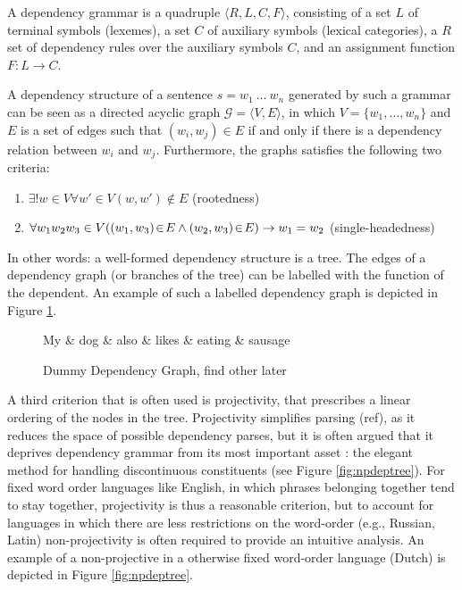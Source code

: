 \documentclass{report}
\theoremstyle{break}
\begin{document}
A dependency grammar is a quadruple $\langle R,L,C,F\rangle$, consisting of a set $L$ of terminal symbols (lexemes), a set $C$ of auxiliary symbols (lexical categories), a $R$ set of dependency rules over the auxiliary symbols $C$, and an assignment function $F : L\rightarrow C$.\citep{hays1964dependency,gaifman1965dependency}

A dependency structure of a sentence $s = w_1~\ldots~w_n$ generated by such a grammar can be seen as a directed acyclic graph $\mathcal{G} = \langle V, E\rangle$, in which $V = \{w_1, \ldots,w_n\}$ and $E$ is a set of edges such that $(w_i,w_j)\in E$ if and only if there is a dependency relation between $w_i$ and $w_j$. Furthermore, the graphs satisfies the following two criteria:
\begin{enumerate}
\item $\exists! w\in V \forall w'\in V (w,w')\notin E$ (rootedness)
\item $\forall w_1 w_2 w_3 \in V( (w_1,w_3)\negthinspace\in\negthinspace E \land (w_2,w_3)\negthinspace \in\negthinspace E ) \rightarrow w_1 = w_2$ (single-headedness)
\end{enumerate} 

In other words: a well-formed dependency structure is a tree. The edges of a dependency graph (or branches of the tree) can be labelled with the function of the dependent. An example of such a labelled dependency graph is depicted in Figure \ref{fig:depgraph}.

\begin{figure}[!ht]
\centering
\begin{dependency}[theme=simple]%
\begin{deptext}[column sep=.5cm, row sep=.1ex]
My \& dog \& also \& likes \& eating \& sausage \\
\end{deptext}
\end{dependency}
\caption{Dummy Dependency Graph, find other later}\label{fig:depgraph}
\end{figure}

A third criterion that is often used is projectivity, that prescribes a linear ordering of the nodes in the tree. Projectivity simplifies parsing (ref), as it reduces the space of possible dependency parses, but it is often argued that it deprives dependency grammar from its most important asset \citep{covington1990dependency,debusmann2000introduction}: the elegant method for handling discontinuous constituents (see Figure \ref{fig:npdeptree}). For fixed word order languages like English, in which phrases belonging together tend to stay together, projectivity is thus a reasonable criterion, but to account for languages in which there are less restrictions on the word-order (e.g., Russian, Latin) non-projectivity is often required to provide an intuitive analysis. An example of a non-projective in a otherwise fixed word-order language (Dutch) is depicted in Figure \ref{fig:npdeptree}.
\end{document}
